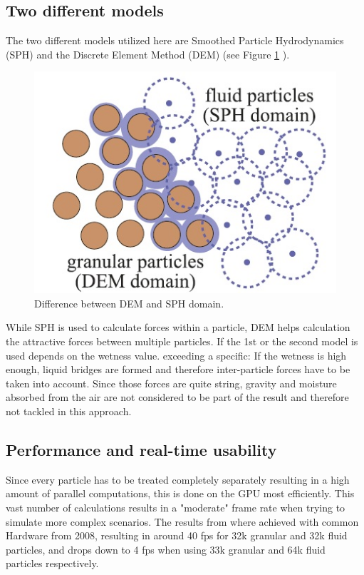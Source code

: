 \subsection{Two different models}
The two different models utilized here are Smoothed Particle Hydrodynamics (SPH) \cite{rungjiratananon2008real} and the Discrete Element Method (DEM) \cite{rungjiratananon2008real} (see Figure \ref{fig:domains} ).

\begin{figure}[htb]
	\centering
	\includegraphics[width=\linewidth]{RSKN08/domains.jpg}
	\caption{Difference between DEM and SPH domain.}
	\label{fig:domains}
\end{figure}

While SPH is used to calculate forces within a particle, DEM helps calculation the attractive forces between multiple particles. If the 1st or the second model is used depends on the wetness value. exceeding a specific: If the wetness is high enough, liquid bridges are formed and therefore inter-particle forces have to be taken into account. Since those forces are quite string, gravity and moisture absorbed from the air are not considered to be part of the result and therefore not tackled in this approach.

\subsection{Performance and real-time usability}
Since every particle has to be treated completely separately resulting in a high amount of parallel computations, this is done on the GPU most efficiently. This vast number of calculations results in a "moderate" frame rate when trying to simulate more complex scenarios. The results from \cite{rungjiratananon2008real} where achieved with common Hardware from 2008, resulting in around 40 fps for 32k granular and 32k fluid particles, and drops down to 4 fps when using 33k granular and 64k fluid particles respectively.

